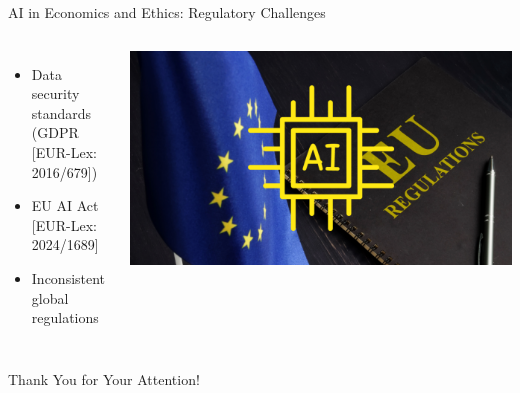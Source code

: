 \documentclass{beamer}
\begin{document}
\begin{frame}{AI in Economics and Ethics: Regulatory Challenges}
    \begin{columns}
            \begin{itemize}
                \item Data security standards \\(GDPR [EUR-Lex: 2016/679])
                \item EU AI Act [EUR-Lex: 2024/1689]
                \item Inconsistent global regulations
            \end{itemize}
            \centering
            \includegraphics[width=\textwidth]{EU-AI-Regulation.png} %
    \end{columns}
\end{frame}

\begin{frame}[plain]
    \centering
    \Huge Thank You for Your Attention!
\end{frame}
\end{document}
